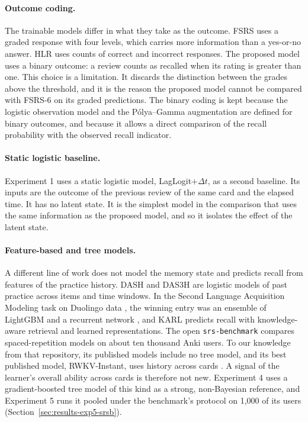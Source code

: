 \paragraph{Outcome coding.}
The trainable models differ in what they take as the outcome. FSRS uses a graded response with four levels,
which carries more information than a yes-or-no answer. HLR uses counts of correct and incorrect responses.
The proposed model uses a binary outcome: a review counts as recalled when its rating is greater than one. This
choice is a limitation. It discards the distinction between the grades above the threshold, and it is the
reason the proposed model cannot be compared with FSRS-6 on its graded predictions. The binary coding is kept
because the logistic observation model and the P\'olya--Gamma augmentation are defined for binary outcomes, and
because it allows a direct comparison of the recall probability with the observed recall indicator.

\paragraph{Static logistic baseline.}
Experiment 1 uses a static logistic model, LagLogit+$\Delta t$, as a second baseline. Its inputs are
the outcome of the previous review of the same card and the elapsed time. It has no latent state. It is
the simplest model in the comparison that uses the same information as the proposed model, and so it
isolates the effect of the latent state.

\paragraph{Feature-based and tree models.}
A different line of work does not model the memory state and predicts recall from features of the practice history.
DASH \cite{lindsey2014improving} and DAS3H \cite{choffin2019das3h} are logistic models of past practice across items and time windows.
In the Second Language Acquisition Modeling task on Duolingo data \cite{settles2018slam}, the winning entry was an ensemble
of LightGBM \cite{ke2017lightgbm} and a recurrent network \cite{osika2018slam}, and KARL \cite{shu2024karl} predicts recall with
knowledge-aware retrieval and learned representations. The open \texttt{srs-benchmark} \cite{srsbenchmark} compares spaced-repetition
models on about ten thousand Anki users. To our knowledge from that repository, its published models include no tree model, and its best published model, RWKV-Instant, uses
history across cards \cite{srsbenchmark}. A signal of the learner's overall ability across cards is therefore not new. Experiment 4 uses a gradient-boosted tree model \cite{friedman2001greedy} of this kind as
a strong, non-Bayesian reference, and Experiment 5 runs it pooled under the benchmark's protocol on 1,000 of its users (Section~\ref{sec:results-exp5-srsb}).

